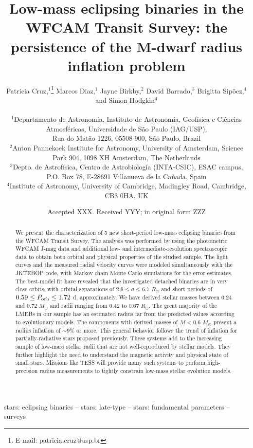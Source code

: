 \documentclass[fleqn,usenatbib]{mnras}
\title[LMEBs in the WTS: the persistence of the M-dwarf radius inflation problem]{Low-mass eclipsing binaries in the WFCAM Transit Survey: the persistence of the M-dwarf radius inflation problem}
\author[P. Cruz et al.]{
Patricia Cruz,$^{1}$\thanks{E-mail: patricia.cruz@usp.br}
Marcos Diaz,$^{1}$
Jayne Birkby,$^{2}$
David Barrado,$^{3}$
Brigitta Sip\"ocz,$^{4}$
\newauthor
 and Simon Hodgkin$^{4}$\\
\\
$^{1}$Departamento de Astronomia, Instituto de Astronomia, Geof\'isica e Ci\^encias Atmosf\'ericas, Universidade de S\~ao Paulo (IAG/USP),\\
Rua do Mat\~ao 1226, 05508-900, S\~ao Paulo, Brazil\\
$^{2}$Anton Pannekoek Institute for Astronomy, University of Amsterdam, Science Park 904, 1098 XH Amsterdam, The Netherlands\\
$^{3}$Depto. de Astrof\'isica, Centro de Astrobiolog\'ia (INTA-CSIC), ESAC campus, P.O. Box 78, E-28691 Villanueva de la Ca\~nada, Spain\\
$^{4}$Institute of Astronomy, University of Cambridge, Madingley Road, Cambridge, CB3 0HA, UK
}
\date{Accepted XXX. Received YYY; in original form ZZZ}
\begin{document}
\label{firstpage}
\pagerange{\pageref{firstpage}--\pageref{lastpage}}
\maketitle

\begin{abstract}
We present the characterization of 5 new short-period low-mass eclipsing binaries from the WFCAM Transit Survey. The analysis was performed by using the photometric WFCAM J-mag data and additional low- and intermediate-resolution spectroscopic data to obtain both orbital and physical properties of the studied sample. 
The light curves and the measured radial velocity curves were modeled simultaneously with the JKTEBOP code, with Markov chain Monte Carlo simulations for the error estimates. 
The best-model fit have revealed that the investigated detached binaries are in very close orbits, with orbital separations of $2.9 \leq a \leq 6.7$ $R_{\odot}$ and short periods of $0.59 \leq P_{\rm orb} \leq 1.72$ d, approximately. We have derived stellar masses between $0.24$ and $0.72$ $M_{\odot}$ and radii ranging from $0.42$ to $0.67$ $R_{\odot}$. 
The great majority of the LMEBs in our sample has an estimated radius far from the predicted values according to evolutionary models. The components with derived masses of $M < 0.6$ $M_{\odot}$ present a radius inflation of $\sim$$9\%$ or more. This general behavior follows the trend of inflation for partially-radiative stars proposed previously. 
These systems add to the increasing sample of low-mass stellar radii that are not well-reproduced by stellar models. They further highlight the need to understand the magnetic activity and physical state of small stars. 
Missions like TESS will provide many such systems to perform high-precision radius measurements to tightly constrain low-mass stellar evolution models.

\end{abstract}

\begin{keywords}
stars: eclipsing binaries -- stars: late-type -- stars: fundamental parameters -- surveys
\end{keywords}


\end{document}
